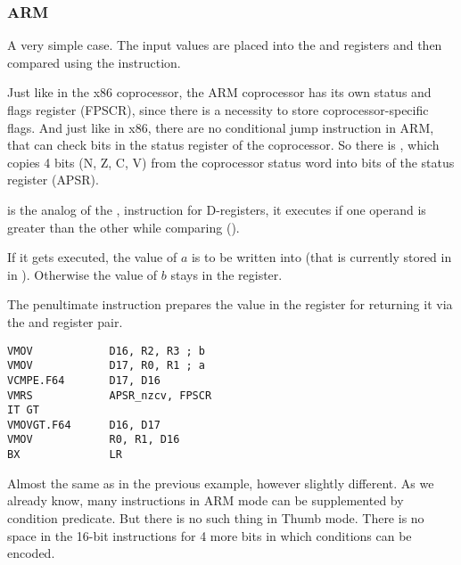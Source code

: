 \subsubsection{ARM}

\myparagraph{\OptimizingXcodeIV (\ARMMode)}



A very simple case.
The input values are placed into the  and  registers and then compared using the  instruction.

Just like in the x86 coprocessor, the ARM coprocessor has its own status and flags register (\ac{FPSCR}),
since there is a necessity to store coprocessor-specific flags.
And just like in x86, there are no conditional jump instruction in ARM, 
that can check bits in the status register of the coprocessor. 
So there is , which copies 4 bits (N, Z, C, V) from the coprocessor status word into bits of the  status register (\ac{APSR}).

 is the analog of the , 
instruction for D-registers, it executes if one operand is greater than the other while comparing (). 

If it gets executed, the value of $a$ is to be written into  (that is currently stored in in ).
Otherwise the value of $b$ stays in the  register.


The penultimate instruction  prepares the value in the  register for returning it via the  and 
register pair.

\myparagraph{\OptimizingXcodeIV (\ThumbTwoMode)}

\begin{lstlisting}[caption=\OptimizingXcodeIV (\ThumbTwoMode)]
VMOV            D16, R2, R3 ; b
VMOV            D17, R0, R1 ; a
VCMPE.F64       D17, D16
VMRS            APSR_nzcv, FPSCR
IT GT 
VMOVGT.F64      D16, D17
VMOV            R0, R1, D16
BX              LR
\end{lstlisting}

Almost the same as in the previous example, however slightly different.
As we already know, many instructions in ARM mode can be supplemented by condition predicate.
But there is no such thing in Thumb mode. 
There is no space in the 16-bit instructions for 4 more bits in which conditions can be encoded.

